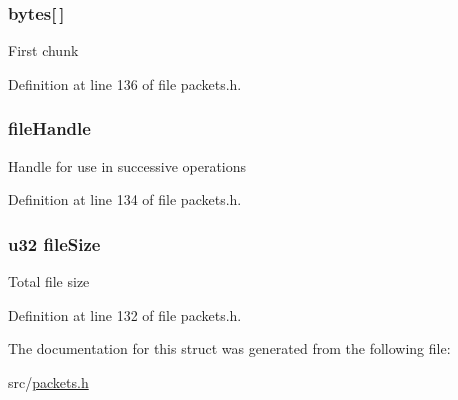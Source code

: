 \subsubsection[{bytes}]{ bytes\mbox{[}$\,$\mbox{]}}\label{struct_b_e_g_i_n___u_p_l_o_a_d___r_e_p_l_y_a1fdde1580342b6b1df0d8f5213c45107}
First chunk 

Definition at line 136 of file packets.\+h.

\hypertarget{struct_b_e_g_i_n___u_p_l_o_a_d___r_e_p_l_y_a1db5fbf603ad47a12353736f89c95073}{}
\subsubsection[{file\+Handle}]{ file\+Handle}\label{struct_b_e_g_i_n___u_p_l_o_a_d___r_e_p_l_y_a1db5fbf603ad47a12353736f89c95073}
Handle for use in successive operations 

Definition at line 134 of file packets.\+h.

\hypertarget{struct_b_e_g_i_n___u_p_l_o_a_d___r_e_p_l_y_afa8cac994ec0579d07285b61ffc8e0c7}{}
\subsubsection[{file\+Size}]{ {\bf u32} file\+Size}\label{struct_b_e_g_i_n___u_p_l_o_a_d___r_e_p_l_y_afa8cac994ec0579d07285b61ffc8e0c7}
Total file size 

Definition at line 132 of file packets.\+h.



The documentation for this struct was generated from the following file\+:\begin{DoxyCompactItemize}
\item 
src/\hyperlink{packets_8h}{packets.\+h}\end{DoxyCompactItemize}
